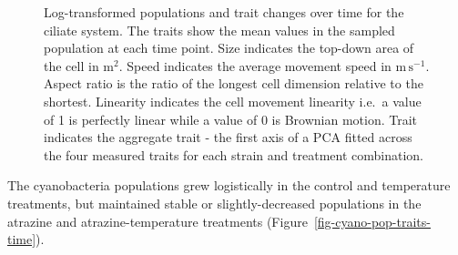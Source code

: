 \documentclass[
  letterpaper,
  DIV=11,
  numbers=noendperiod]{scrartcl}
\begin{document}
\begin{figure}


\caption{\label{fig-cilia-pop-traits-time}Log-transformed populations
and trait changes over time for the ciliate system. The traits show the
mean values in the sampled population at each time point. Size indicates
the top-down area of the cell in \textmu\(\mathrm{m}^{2}\). Speed
indicates the average movement speed in \textmu\(\mathrm{m \, s}^{-1}\).
Aspect ratio is the ratio of the longest cell dimension relative to the
shortest. Linearity indicates the cell movement linearity i.e.~a value
of 1 is perfectly linear while a value of 0 is Brownian motion. Trait
indicates the aggregate trait - the first axis of a PCA fitted across
the four measured traits for each strain and treatment combination.}

\end{figure}%

The cyanobacteria populations grew logistically in the control and
temperature treatments, but maintained stable or slightly-decreased
populations in the atrazine and atrazine-temperature treatments
(Figure~\ref{fig-cyano-pop-traits-time}).
\end{document}
